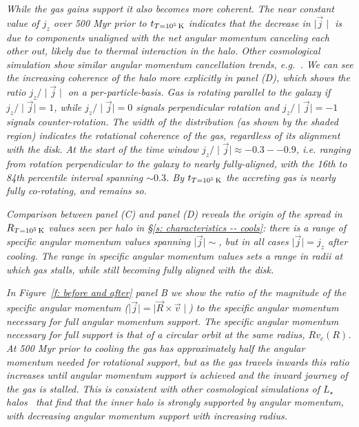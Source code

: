\documentclass[fleqn,usenatbib]{mnras}
\newcommand{\Rcon}{R_{T=10^5\,{\rm K}}}
\newcommand{\tcon}{t_{T=10^5\,{\rm K}}}
\begin{document}
\textit{
While the gas gains support it also becomes more coherent.
The near constant value of $j_z$ over 500 Myr prior to $\tcon$ indicates that the decrease in $\mid \vec j \mid$ is due to components unaligned with the net angular momentum canceling each other out, likely due to thermal interaction in the halo.
Other cosmological simulation show similar angular momentum cancellation trends, e.g.~\cite{DeFelippis2017}.
We can see the increasing coherence of the halo more explicitly in panel (D), which shows the ratio $j_z/\mid\vec j\mid$ on a per-particle-basis.
Gas is rotating parallel to the galaxy if $j_z/\mid \vec j \mid=1$, while $j_z/\mid \vec j \mid=0$ signals perpendicular rotation and $j_z/\mid \vec j \mid=-1$ signals counter-rotation.
The width of the distribution (as shown by the shaded region) indicates the rotational coherence of the gas, regardless of its alignment with the disk.
At the start of the time window $j_z/\mid\vec j\mid \approx -0.3 -- 0.9$, i.e. ranging from rotation perpendicular to the galaxy to nearly fully-aligned, with the 16th to 84th percentile interval spanning $\sim 0.3$.
By $\tcon$ the accreting gas is nearly fully co-rotating, and remains so.
}

\textit{
Comparison between panel (C) and panel (D) reveals the origin of the spread in $\Rcon$ values seen per halo in \S\ref{s: characteristics -- cools}:
there is a range of specific angular momentum values spanning $\mid\vec j\mid \sim$, but in all cases $\mid\vec j\mid = j_z$ after cooling.
The range in specific angular momentum values sets a range in radii at which gas stalls, while still becoming fully aligned with the disk.
}

\textit{
In Figure~\ref{f: before and after} panel B we show the ratio of the magnitude of the specific angular momentum ($\mid \vec j \mid = \mid \vec R \times \vec v \mid$) to the specific angular momentum necessary for full angular momentum support.
The specific angular momentum necessary for full support is that of a circular orbit at the same radius, $R v_c(R)$.
At 500 Myr prior to cooling the gas has approximately half the angular momentum needed for rotational support, but as the gas travels inwards this ratio increases until angular momentum support is achieved and the inward journey of the gas is stalled.
This is consistent with other cosmological simulations of $L_\star$ halos~\citep[e.g.][]{Oppenheimer2018} that find that the inner halo is strongly supported by angular momentum, with decreasing angular momentum support with increasing radius.
}
\end{document}
